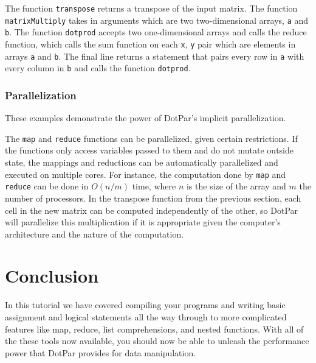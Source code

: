 \documentclass{article}
\begin{document}
The function \verb!transpose! returns a transpose of the input matrix. The function \verb!matrixMultiply! takes in arguments which are two two-dimensional arrays, \verb!a! and \verb!b!. The function \verb!dotprod! accepts two one-dimensional arrays and calls the reduce function, which calls the sum function on each \verb!x!, \verb!y! pair which are elements in arrays \verb!a! and \verb!b!. The final line returns a statement that pairs every row in \verb!a! with every column in \verb!b! and calls the function \verb!dotprod!.

\subsubsection{Parallelization}
These examples demonstrate the power of DotPar's implicit parallelization.

The \verb!map! and \verb!reduce! functions can be parallelized, given certain restrictions. If the functions only access variables passed to them and do not mutate outside state, the mappings and reductions can be automatically parallelized and executed on multiple cores. For instance, the computation done by \verb!map! and \verb!reduce! can be done in $O(n/m)$ time, where $n$ is the size of the array and $m$ the number of processors. In the transpose function from the previous section, each cell in the new matrix can be computed independently of the other, so DotPar will parallelize this multiplication if it is appropriate given the computer's architecture and the nature of the computation.

\section{Conclusion}
In this tutorial we have covered compiling your programs and writing basic assignment and logical statements all the way through to more complicated features like map, reduce, list comprehensions, and nested functions. With all of the these tools now available, you should now be able to unleash the performance power that DotPar provides for data manipulation.
\end{document}

